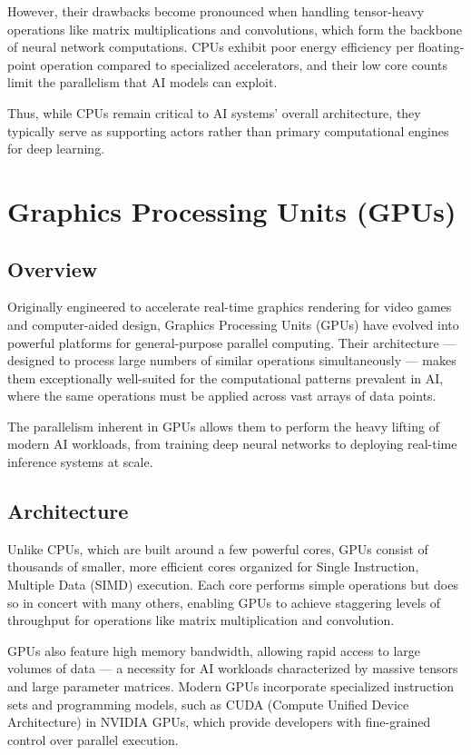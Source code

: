 \documentclass[openany]{book}
\begin{document}
However, their drawbacks become pronounced when handling tensor-heavy operations 
like matrix multiplications and convolutions, which form the backbone of neural 
network computations. CPUs exhibit poor energy efficiency per floating-point 
operation compared to specialized accelerators, and their low core counts limit 
the parallelism that AI models can exploit.

Thus, while CPUs remain critical to AI systems' overall architecture, they 
typically serve as supporting actors rather than primary computational engines 
for deep learning.

\section{Graphics Processing Units (GPUs)}

\subsection{Overview}
Originally engineered to accelerate real-time graphics rendering for video games 
and computer-aided design, Graphics Processing Units (GPUs) have evolved into 
powerful platforms for general-purpose parallel computing. Their architecture — 
designed to process large numbers of similar operations simultaneously — makes 
them exceptionally well-suited for the computational patterns prevalent in AI, 
where the same operations must be applied across vast arrays of data points.

The parallelism inherent in GPUs allows them to perform the heavy lifting of 
modern AI workloads, from training deep neural networks to deploying real-time 
inference systems at scale.

\subsection{Architecture}
Unlike CPUs, which are built around a few powerful cores, GPUs consist of 
thousands of smaller, more efficient cores organized for Single Instruction, 
Multiple Data (SIMD) execution. Each core performs simple operations but does 
so in concert with many others, enabling GPUs to achieve staggering levels of 
throughput for operations like matrix multiplication and convolution.

GPUs also feature high memory bandwidth, allowing rapid access to large volumes 
of data — a necessity for AI workloads characterized by massive tensors and 
large parameter matrices. Modern GPUs incorporate specialized instruction sets 
and programming models, such as CUDA (Compute Unified Device Architecture) in 
NVIDIA GPUs, which provide developers with fine-grained control over parallel 
execution.
\end{document}
